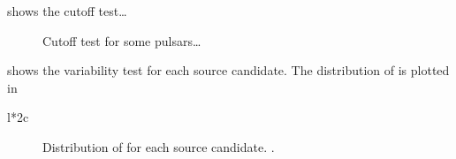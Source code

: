  shows the cutoff test\ldots

\begin{figure}
  \ifdefined\bwfigures
  \else
  \fi
  \caption{Cutoff test for some pulsars\dots}
  \label{fig:cutoff_test}
\end{figure}


 shows the variability test for each source
candidate. The distribution of \tsvar is plotted in 

\begin{deluxetable}{l*{2}c}
\tabletypesize{\scriptsize}

\end{deluxetable}

\begin{figure}
  \ifdefined\bwfigures
  \else
  \fi
  \caption{Distribution of \tsvar for each source candidate. .}
  \label{fig:variability}
\end{figure}
